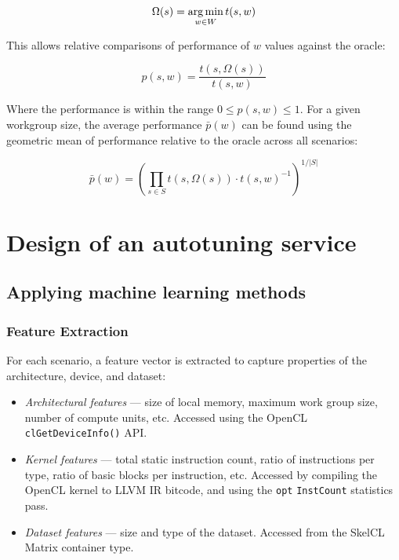 \begin{equation}
\Omega(s) = \operatorname*{arg\,min}_{w \in W} t(s,w)
\end{equation}

This allows relative comparisons of performance of $w$ values against
the oracle:

\begin{equation}
p(s,w) = \frac{t(s,\Omega(s))}{t(s,w)}
\end{equation}

Where the performance is within the range $0 \le p(s,w) \le 1$. For a
given workgroup size, the average performance $\bar{p}(w)$ can be
found using the geometric mean of performance relative to the oracle
across all scenarios:

\begin{equation}
\bar{p}(w) =
\left(
  \prod_{s \in S} t(s,\Omega(s)) \cdot t(s,w)^{-1}
\right)^{1/|S|}
\end{equation}


\section{Design of an autotuning service}

\subsection{Applying machine learning methods}

\subsubsection{Feature Extraction}

For each scenario, a feature vector is extracted to capture properties
of the architecture, device, and dataset:

\begin{itemize}
\item \emph{Architectural features} --- size of local memory, maximum
  work group size, number of compute units, etc. Accessed using the
  OpenCL \texttt{clGetDeviceInfo()} API.
\item \emph{Kernel features} --- total static instruction count, ratio
  of instructions per type, ratio of basic blocks per instruction,
  etc. Accessed by compiling the OpenCL kernel to LLVM IR bitcode, and
  using the \texttt{opt} \texttt{InstCount} statistics pass.
\item \emph{Dataset features} --- size and type of the
  dataset. Accessed from the SkelCL Matrix container type.
\end{itemize}

